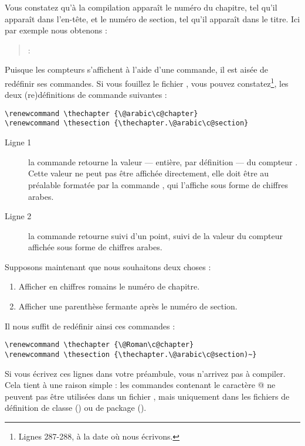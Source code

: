 Vous constatez qu'à la compilation apparaît le numéro du chapitre, tel qu'il apparaît dans l'en-tête, et le numéro de section, tel qu'il apparaît dans le titre. Ici par exemple nous obtenons :


\begin{quotation}
\thechapter : \thesection
\end{quotation}


Puisque les compteurs s'affichent à l'aide d'une commande, il est aisée de redéfinir ses commandes. Si vous fouillez le fichier , vous pouvez constatez\footnote{Lignes 287-288, à la date où nous écrivons.}, les deux (re)définitions de commande suivantes :

\begin{verbatim}
\renewcommand \thechapter {\@arabic\c@chapter}
\renewcommand \thesection {\thechapter.\@arabic\c@section}
\end{verbatim}

\begin{description}
\item[Ligne 1]la commande  retourne la valeur --- entière, par définition --- du compteur . Cette valeur ne peut pas être affichée directement, elle doit être au préalable formatée par la commande , qui l'affiche sous forme de chiffres arabes.
\item[Ligne 2]la commande  retourne  suivi d'un point, suivi de la valeur du compteur  affichée sous forme de chiffres arabes.
\end{description}

Supposons maintenant que nous souhaitons deux choses :
\begin{enumerate}
\item Afficher en chiffres romains le numéro de chapitre.
\item Afficher une parenthèse fermante après le numéro de section.
\end{enumerate}

Il nous suffit de redéfinir ainsi ces commandes :

\begin{verbatim}
\renewcommand \thechapter {\@Roman\c@chapter}
\renewcommand \thesection {\thechapter.\@arabic\c@section)~}
\end{verbatim} 

\label{makeatletter}Si vous écrivez ces lignes dans votre préambule, vous n'arrivez pas à compiler. Cela tient à une raison simple : les commandes contenant le caractère @ ne peuvent pas être  utilisées dans un fichier , mais uniquement dans les fichiers de définition de classe () ou de package ().


